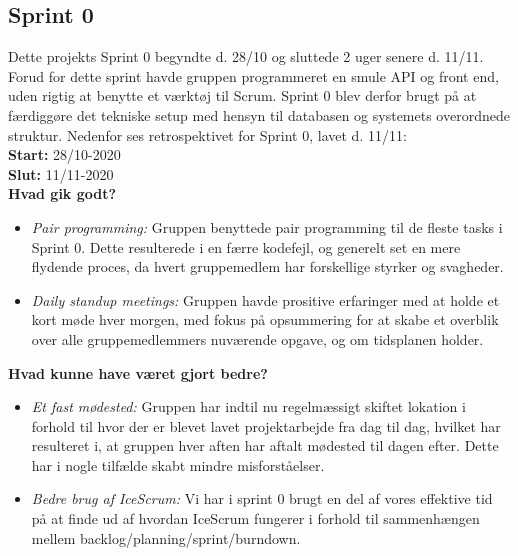 \subsection{Sprint 0}
Dette projekts Sprint 0 begyndte d. 28/10 og sluttede 2 uger senere d. 11/11. Forud for dette sprint havde
gruppen programmeret en smule API og front end, uden rigtig at benytte et værktøj til Scrum. Sprint 0
blev derfor brugt på at færdiggøre det tekniske setup med hensyn til databasen og systemets overordnede struktur. 
Nedenfor ses retrospektivet for Sprint 0, lavet d. 11/11: \\

\textbf{Start:} 28/10-2020 \\
\textbf{Slut:} 11/11-2020 \\

\textbf{Hvad gik godt?}
\begin{itemize}
    \item \textit{Pair programming:} Gruppen benyttede pair programming til de fleste tasks i Sprint 0. Dette resulterede
    i en færre kodefejl, og generelt set en mere flydende proces, da hvert gruppemedlem har forskellige styrker og svagheder.
    \item \textit{Daily standup meetings:} Gruppen havde prositive erfaringer med at holde et kort møde hver morgen, 
    med fokus på opsummering for at skabe et overblik over alle gruppemedlemmers nuværende opgave, og om tidsplanen holder.
\end{itemize}

\textbf{Hvad kunne have været gjort bedre?}
\begin{itemize}
    \item \textit{Et fast mødested:} Gruppen har indtil nu regelmæssigt skiftet lokation i forhold til hvor der er blevet lavet projektarbejde fra dag til dag, 
    hvilket har resulteret i, at gruppen hver aften har aftalt mødested til dagen efter. Dette har i nogle tilfælde skabt mindre misforståelser.
    \item \textit{Bedre brug af IceScrum:} Vi har i sprint 0 brugt en del af vores effektive tid på at finde ud af hvordan IceScrum fungerer
    i forhold til sammenhængen mellem backlog/planning/sprint/burndown.
\end{itemize}

